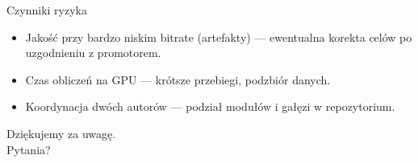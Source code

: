 \documentclass[aspectratio=169,11pt]{beamer}
\begin{document}
\begin{frame}{Czynniki ryzyka}
  \begin{itemize}
    \item Jakość przy bardzo niskim bitrate (artefakty) --- ewentualna korekta celów po uzgodnieniu z promotorem.
    \item Czas obliczeń na GPU --- krótsze przebiegi, podzbiór danych.
    \item Koordynacja dwóch autorów --- podział modułów i gałęzi w repozytorium.
  \end{itemize}
\end{frame}

\begin{frame}[plain]
  \begin{center}
    {\Large Dziękujemy za uwagę.}\\[1.2em]
    Pytania?
  \end{center}
\end{frame}
\end{document}
